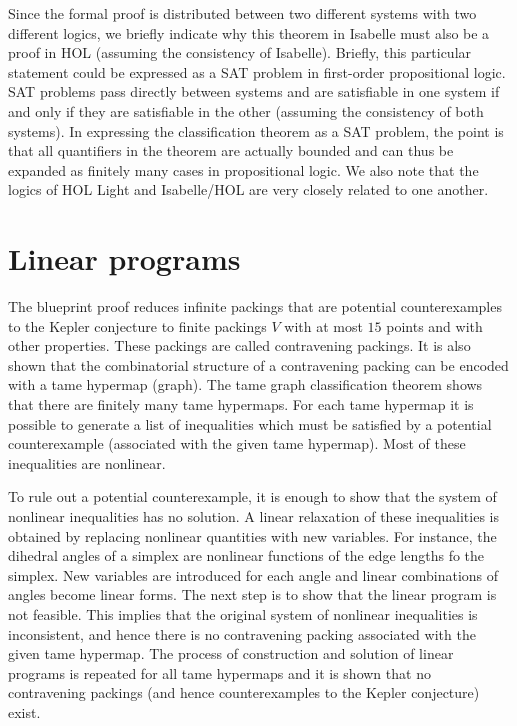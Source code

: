 Since the formal proof is distributed between two different systems
with two different logics, we briefly indicate why this theorem in
Isabelle must also be a proof in HOL (assuming the consistency of
Isabelle).  Briefly, this particular statement could be expressed as a
SAT problem in first-order propositional logic.  SAT problems pass
directly between systems and are satisfiable in one system if and only
if they are satisfiable in the other (assuming the consistency of both
systems).  In expressing the classification theorem as a SAT problem,
the point is that all quantifiers in the theorem are actually bounded
and can thus be expanded as finitely many cases in propositional
logic.  We also note that the logics of HOL Light and Isabelle/HOL are
very closely related to one another.

\section{Linear programs}

The blueprint proof reduces infinite packings that are potential
counterexamples to the Kepler
conjecture to finite packings $V$ with at most $15$ points and with
other properties. These packings are called contravening packings. It
is also shown that the combinatorial structure of a contravening
packing can be encoded with a tame hypermap (graph). The tame
graph classification theorem  shows that there are finitely many
tame hypermaps. For each tame hypermap it is possible to generate a
list of inequalities which must be satisfied by a potential
counterexample (associated with the given tame hypermap). Most of
these inequalities are nonlinear. 

To rule out a potential counterexample, it is enough to show that the
system of nonlinear inequalities has no solution.  A linear relaxation
of these inequalities is obtained by replacing nonlinear quantities
with new variables. For instance, the dihedral angles of a simplex are
nonlinear functions of the edge lengths fo the simplex. New variables
are introduced for each angle and linear combinations of angles become
linear forms. The next step is to show that the linear program is not
feasible. This implies that the original system of nonlinear
inequalities is inconsistent, and hence there is no contravening
packing associated with the given tame hypermap. The process of
construction and solution of linear programs is repeated for all tame
hypermaps and it is shown that no contravening packings (and hence
counterexamples to the Kepler conjecture) exist.

